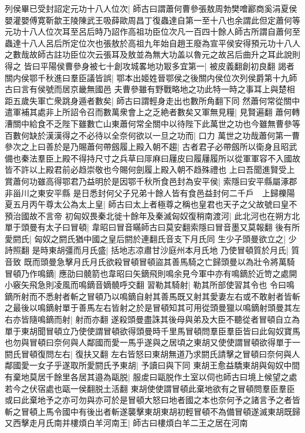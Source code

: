 列侯畢已受封詔定元功十八人位次|{
	師古曰謂蕭何曹參張敖周勃樊噲酈商奚涓夏侯嬰灌嬰傅寛靳歙王陵陳武王吸薛歐周昌丁復蟲達自第一至十八也余謂此但定蕭何等元功十八人位次耳至呂后時乃詔作高祖功臣位次凡一百四十餘人師古所謂自蕭何至蟲達十八人呂后所定位次也張敖於高祖九年始自趙王廢為宣平侯安得預元功十八人之數哉故師古註功臣位次云張耳及敖並為無大功盖以魯元之故呂后曲升之耳此說則得之}
皆曰平陽侯曹參身被七十創攻城畧地功冣多宜第一|{
	被皮義翻創初良翻}
謁者關内侯鄂千秋進曰羣臣議皆誤|{
	鄂本出姬姓晉鄂侯之後關内侯位次列侯爵第十九師古曰言有侯號而居京畿無國邑}
夫曹參雖有野戰略地之功此特一時之事耳上與楚相距五歲失軍亡衆跳身遁者數矣|{
	師古曰謂輕身走出也數所角翻下同}
然蕭何常從關中遣軍補其處非上所詔令召而數萬衆會上之乏絶者數矣又軍無見糧|{
	見賢遍翻}
蕭何轉漕關中給食不乏陛下雖數亡山東蕭何常全關中以待陛下此萬世之功也今雖無曹參等百數何缺於漢漢得之不必待以全奈何欲以一旦之功而|{
	口力}
萬世之功哉蕭何第一曹參次之上曰善於是乃賜蕭何帶劔履上殿入朝不趨|{
	古者君子必帶劔所以衛身且昭武備也秦法羣臣上殿不得持尺寸之兵草曰厞麻曰屨皮曰履屨履所以從軍軍容不入國故皆不許以上殿君前必趋崇敬也今賜何劍履上殿入朝不趋殊禮也}
上曰吾聞進賢受上賞蕭何功雖高得鄂君乃益明於是因鄂千秋所食邑封為安平侯|{
	索隱曰安平縣屬涿郡非甾川之東安平縣}
是日悉封何父子兄弟十餘人皆有食邑益封何二千戶　上歸櫟陽夏五月丙午尊太公為太上皇|{
	師古曰太上者極尊之稱也皇君也天子之父故號曰皇不預治國故不言帝}
初匈奴畏秦北徙十餘年及秦滅匈奴復稍南渡河|{
	此北河也在朔方北}
單于頭曼有太子曰冒頓|{
	韋昭曰冒音瞞師古曰莫安翻索隱曰冒音墨又莫報翻}
後有所愛閼氏|{
	匈奴之閼氏猶中國之皇后閼於連翻氏音支下月氏同}
生少子頭曼欲立之|{
	少詩照翻}
是時東胡彊而月氏盛|{
	括地志凉肅甘沙庭州本月氏地}
乃使冒頓質於月氏|{
	質音致}
既而頭曼急擊月氏月氏欲殺冒頓冒頓盜其善馬騎之亡歸頭曼以為壯令將萬騎冒頓乃作鳴鏑|{
	應劭曰髐箭也韋昭曰矢鏑飛則鳴余見今軍中亦有鳴鏑於近笴之處開小竅矢飛急則凌風而鳴鏑音嫡髐呼交翻}
習勒其騎射|{
	勒其所部使習其令也}
令曰鳴鏑所射而不悉射者斬之冒頓乃以鳴鏑自射其善馬既又射其愛妻左右或不敢射者皆斬之最後以鳴鏑射單于善馬左右皆射之於是冒頓知其可用從頭曼獵以鳴鏑射頭曼其左右亦皆隨鳴鏑而射|{
	射而亦翻}
遂殺頭曼盡誅其後母與弟及大臣不聽從者冒頓自立為單于東胡聞冒頓立乃使使謂冒頓欲得頭曼時千里馬冒頓問羣臣羣臣皆曰此匈奴寶馬也勿與冒頓曰奈何與人鄰國而愛一馬乎遂與之居頃之東胡又使使謂冒頓欲得單于一閼氏冒頓復問左右|{
	復扶又翻}
左右皆怒曰東胡無道乃求閼氏請擊之冒頓曰奈何與人鄰國愛一女子乎遂取所愛閼氏予東胡|{
	予讀曰與下同}
東胡王愈益驕東胡與匈奴中間有棄地莫居千餘里各居其邉為甌脱|{
	服䖍曰甌脱作土室以伺也師古曰境上候望之處若今之伏宿處也甌一侯翻脱土活翻}
東胡使使謂冒頓此棄地欲有之冒頓問羣臣羣臣或曰此棄地予之亦可勿與亦可於是冒頓大怒曰地者國之本也奈何予之諸言予之者皆斬之冒頓上馬令國中有後出者斬遂襲擊東胡東胡初輕冒頓不為備冒頓遂滅東胡既歸又西擊走月氏南并樓煩白羊河南王|{
	師古曰樓煩白羊二王之居在河南}
